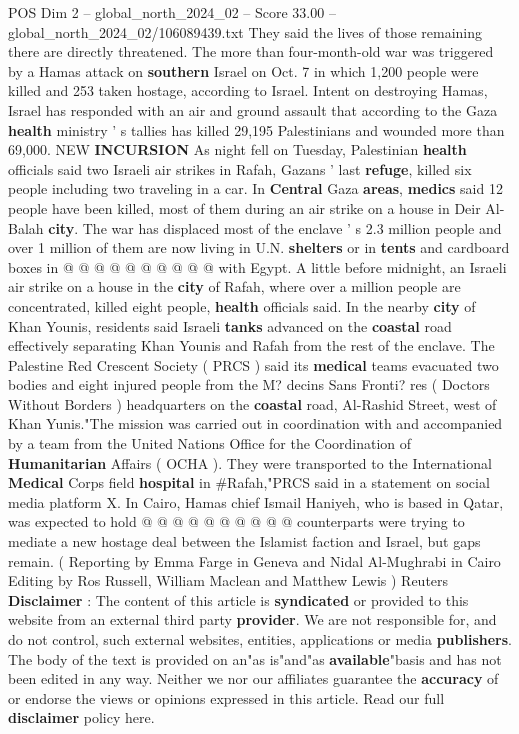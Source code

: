 \begin{textsample}{POS Dim 2 – global\_north\_2024\_02 – Score 33.00 – global\_north\_2024\_02/106089439.txt}
They said the lives of those remaining there are directly threatened.
The more than four-month-old war was triggered by a Hamas attack on \textbf{southern} Israel on Oct. 7 in which 1,200 people were killed and 253 taken hostage, according to Israel.
Intent on destroying Hamas, Israel has responded with an air and ground assault that according to the Gaza \textbf{health} ministry ' s tallies has killed 29,195 Palestinians and wounded more than 69,000.
NEW \textbf{INCURSION} As night fell on Tuesday, Palestinian \textbf{health} officials said two Israeli air strikes in Rafah, Gazans ' last \textbf{refuge}, killed six people including two traveling in a car.
In \textbf{Central} Gaza \textbf{areas}, \textbf{medics} said 12 people have been killed, most of them during an air strike on a house in Deir Al-Balah \textbf{city}.
The war has displaced most of the enclave ' s 2.3 million people and over 1 million of them are now living in U.N. \textbf{shelters} or in \textbf{tents} and cardboard boxes in @ @ @ @ @ @ @ @ @ @ with Egypt.
A little before midnight, an Israeli air strike on a house in the \textbf{city} of Rafah, where over a million people are concentrated, killed eight people, \textbf{health} officials said.
In the nearby \textbf{city} of Khan Younis, residents said Israeli \textbf{tanks} advanced on the \textbf{coastal} road effectively separating Khan Younis and Rafah from the rest of the enclave.
The Palestine Red Crescent Society ( PRCS ) said its \textbf{medical} teams evacuated two bodies and eight injured people from the M? decins Sans Fronti? res ( Doctors Without Borders ) headquarters on the \textbf{coastal} road, Al-Rashid Street, west of Khan Yunis."The mission was carried out in coordination with and accompanied by a team from the United Nations Office for the Coordination of \textbf{Humanitarian} Affairs ( OCHA ).
They were transported to the International \textbf{Medical} Corps field \textbf{hospital} in \#Rafah,"PRCS said in a statement on social media platform X.
In Cairo, Hamas chief Ismail Haniyeh, who is based in Qatar, was expected to hold @ @ @ @ @ @ @ @ @ @ counterparts were trying to mediate a new hostage deal between the Islamist faction and Israel, but gaps remain. ( Reporting by Emma Farge in Geneva and Nidal Al-Mughrabi in Cairo Editing by Ros Russell, William Maclean and Matthew Lewis ) Reuters \textbf{Disclaimer} : The content of this article is \textbf{syndicated} or provided to this website from an external third party \textbf{provider}.
We are not responsible for, and do not control, such external websites, entities, applications or media \textbf{publishers}.
The body of the text is provided on an"as is"and"as \textbf{available}"basis and has not been edited in any way.
Neither we nor our affiliates guarantee the \textbf{accuracy} of or endorse the views or opinions expressed in this article.
Read our full \textbf{disclaimer} policy here.


\end{textsample}
